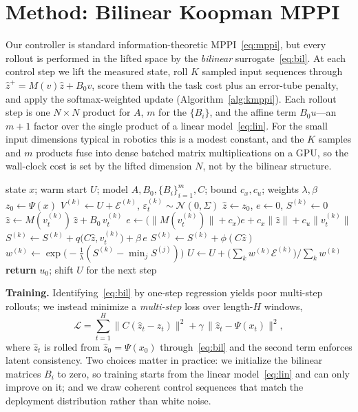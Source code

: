 \documentclass[lettersize,journal]{IEEEtran}
\theoremstyle{remark}
\begin{document}
\section{Method: Bilinear Koopman MPPI}\label{sec:method}
Our controller is standard information-theoretic MPPI~\eqref{eq:mppi}, but every rollout is performed in the lifted space by the \emph{bilinear} surrogate~\eqref{eq:bil}.
At each control step we lift the measured state, roll $K$ sampled input sequences through $\hat z^+ = M(v)\hat z + B_0 v$, score them with the task cost plus an error-tube penalty, and apply the softmax-weighted update (Algorithm~\ref{alg:kmppi}).
Each rollout step is one $N\times N$ product for $A$, $m$ for the $\{B_i\}$, and the affine term $B_0u$---an $m{+}1$ factor over the single product of a linear model~\eqref{eq:lin}.
For the small input dimensions typical in robotics this is a modest constant, and the $K$ samples and $m$ products fuse into dense batched matrix multiplications on a GPU, so the wall-clock cost is set by the lifted dimension $N$, not by the bilinear structure.

\begin{algorithm}[t]
\caption{Bilinear Koopman MPPI (one control step)}\label{alg:kmppi}
\begin{algorithmic}[1]
\REQUIRE state $x$; warm start $U$; model $A,B_0,\{B_i\}_{i=1}^m,C$; bound $c_x,c_u$; weights $\lambda,\beta$
\STATE $z_0 \leftarrow \Psi(x)$
  \STATE $V^{(k)} \leftarrow U + \mathcal E^{(k)}$, \quad $\varepsilon_t^{(k)}\sim\mathcal N(0,\Sigma)$
  \STATE $\hat z \leftarrow z_0$,\; $e\leftarrow 0$,\; $S^{(k)}\leftarrow 0$
    \STATE $\hat z \leftarrow M(v_t^{(k)})\,\hat z + B_0\,v_t^{(k)}$
    \STATE $e \leftarrow \big(\|M(v_t^{(k)})\|+c_x\big)e + c_x\|\hat z\| + c_u\|v_t^{(k)}\|$
    \STATE $S^{(k)} \leftarrow S^{(k)} + q\big(C\hat z, v_t^{(k)}\big) + \beta\, e$
  \ENDFOR
  \STATE $S^{(k)} \leftarrow S^{(k)} + \phi(C\hat z)$
\ENDFOR
\STATE $w^{(k)} \leftarrow \exp\!\big(-\tfrac1\lambda(S^{(k)}-\min_j S^{(j)})\big)$
\STATE $U \leftarrow U + \big(\textstyle\sum_k w^{(k)}\mathcal E^{(k)}\big)\big/\textstyle\sum_k w^{(k)}$
\STATE \textbf{return} $u_0$;\; shift $U$ for the next step
\end{algorithmic}
\end{algorithm}

\textbf{Training.}
Identifying~\eqref{eq:bil} by one-step regression yields poor multi-step rollouts; we instead minimize a \emph{multi-step} loss over length-$H$ windows,
\begin{equation}\label{eq:trainloss}
\mathcal L = \sum_{t=1}^{H}\big\|C(\hat z_t - z_t)\big\|^2 + \gamma\,\big\|\hat z_t - \Psi(x_t)\big\|^2,
\end{equation}
where $\hat z_t$ is rolled from $\hat z_0=\Psi(x_0)$ through~\eqref{eq:bil} and the second term enforces latent consistency.
Two choices matter in practice: we initialize the bilinear matrices $B_i$ to zero, so training starts from the linear model~\eqref{eq:lin} and can only improve on it; and we draw coherent control sequences that match the deployment distribution rather than white noise.
\end{document}
